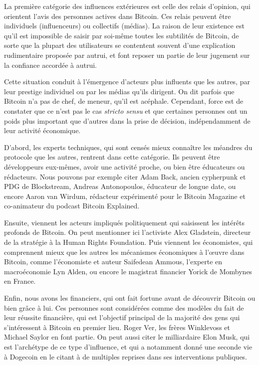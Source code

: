La première catégorie des influences extérieures est celle des relais d'opinion, qui orientent l'avis des personnes actives dans Bitcoin. Ces relais peuvent être individuels (influenceurs) ou collectifs (médias). La raison de leur existence est qu'il est impossible de saisir par soi-même toutes les subtilités de Bitcoin, de sorte que la plupart des utilisateurs se contentent souvent d'une explication rudimentaire proposée par autrui, et font reposer un partie de leur jugement sur la confiance accordée à autrui.

Cette situation conduit à l'émergence d'acteurs plus influents que les autres, par leur prestige individuel ou par les médias qu'ils dirigent. On dit parfois que Bitcoin n'a pas de chef, de meneur, qu'il est acéphale. Cependant, force est de constater que ce n'est pas le cas \emph{stricto sensu} et que certaines personnes ont un poids plus important que d'autres dans la prise de décision, indépendamment de leur activité économique.

D'abord, les experts techniques, qui sont censés mieux connaître les méandres du protocole que les autres, rentrent dans cette catégorie. Ils peuvent être développeurs eux-mêmes, avoir une activité proche, ou bien être éducateurs ou rédacteurs. Nous pouvons par exemple citer Adam Back, ancien cypherpunk et PDG de Blockstream, Andreas Antonopoulos, éducateur de longue date, ou encore Aaron van Wirdum, rédacteur expérimenté pour le Bitcoin Magazine et co-animateur du podcast Bitcoin Explained.

Ensuite, viennent les acteurs impliqués politiquement qui saisissent les intérêts profonds de Bitcoin. On peut mentionner ici l'activiste Alex Gladstein, directeur de la stratégie à la Human Rights Foundation. Puis viennent les économistes, qui comprennent mieux que les autres les mécanismes économiques à l'œuvre dans Bitcoin, comme l'économiste et auteur Saifedean Ammous, l'experte en macroéconomie Lyn Alden, ou encore le magistrat financier Yorick de Mombynes en France.

Enfin, nous avons les financiers, qui ont fait fortune avant de découvrir Bitcoin ou bien grâce à lui. Ces personnes sont considérées comme des modèles du fait de leur réussite financière, qui est l'objectif principal de la majorité des gens qui s'intéressent à Bitcoin en premier lieu. Roger Ver, les frères Winklevoss et Michael Saylor en font partie. On peut aussi citer le milliardaire Elon Musk, qui est l'archétype de ce type d'influence, et qui a notamment donné une seconde vie à Dogecoin en le citant à de multiples reprises dans ses interventions publiques.

